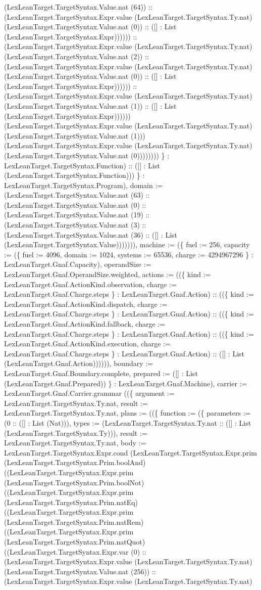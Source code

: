 \documentclass[11pt]{article}
\begin{document}
(LexLeanTarget.TargetSyntax.Value.nat (64)) :: (LexLeanTarget.TargetSyntax.Expr.value (LexLeanTarget.TargetSyntax.Ty.nat) (LexLeanTarget.TargetSyntax.Value.nat (0)) :: ([] : List (LexLeanTarget.TargetSyntax.Expr)))))) :: (LexLeanTarget.TargetSyntax.Expr.value (LexLeanTarget.TargetSyntax.Ty.nat) (LexLeanTarget.TargetSyntax.Value.nat (2)) :: (LexLeanTarget.TargetSyntax.Expr.value (LexLeanTarget.TargetSyntax.Ty.nat) (LexLeanTarget.TargetSyntax.Value.nat (0)) :: ([] : List (LexLeanTarget.TargetSyntax.Expr)))))) :: (LexLeanTarget.TargetSyntax.Expr.value (LexLeanTarget.TargetSyntax.Ty.nat) (LexLeanTarget.TargetSyntax.Value.nat (1)) :: ([] : List (LexLeanTarget.TargetSyntax.Expr)))))) (LexLeanTarget.TargetSyntax.Expr.value (LexLeanTarget.TargetSyntax.Ty.nat) (LexLeanTarget.TargetSyntax.Value.nat (1))) (LexLeanTarget.TargetSyntax.Expr.value (LexLeanTarget.TargetSyntax.Ty.nat) (LexLeanTarget.TargetSyntax.Value.nat (0)))))))) \} : LexLeanTarget.TargetSyntax.Function) :: ([] : List (LexLeanTarget.TargetSyntax.Function))) \} : LexLeanTarget.TargetSyntax.Program), domain := (LexLeanTarget.TargetSyntax.Value.nat (63) :: (LexLeanTarget.TargetSyntax.Value.nat (0) :: (LexLeanTarget.TargetSyntax.Value.nat (19) :: (LexLeanTarget.TargetSyntax.Value.nat (3) :: (LexLeanTarget.TargetSyntax.Value.nat (36) :: ([] : List (LexLeanTarget.TargetSyntax.Value))))))), machine := (\{ fuel := 256, capacity := (\{ fuel := 4096, domain := 1024, systems := 65536, charge := 4294967296 \} : LexLeanTarget.Gnaf.Capacity), operandSize := LexLeanTarget.Gnaf.OperandSize.weighted, actions := ((\{ kind := LexLeanTarget.Gnaf.ActionKind.observation, charge := LexLeanTarget.Gnaf.Charge.steps \} : LexLeanTarget.Gnaf.Action) :: ((\{ kind := LexLeanTarget.Gnaf.ActionKind.dispatch, charge := LexLeanTarget.Gnaf.Charge.steps \} : LexLeanTarget.Gnaf.Action) :: ((\{ kind := LexLeanTarget.Gnaf.ActionKind.fallback, charge := LexLeanTarget.Gnaf.Charge.steps \} : LexLeanTarget.Gnaf.Action) :: ((\{ kind := LexLeanTarget.Gnaf.ActionKind.execution, charge := LexLeanTarget.Gnaf.Charge.steps \} : LexLeanTarget.Gnaf.Action) :: ([] : List (LexLeanTarget.Gnaf.Action)))))), boundary := LexLeanTarget.Gnaf.Boundary.complete, prepared := ([] : List (LexLeanTarget.Gnaf.Prepared)) \} : LexLeanTarget.Gnaf.Machine), carrier := LexLeanTarget.Gnaf.Carrier.grammar ((\{ argument := LexLeanTarget.TargetSyntax.Ty.nat, result := LexLeanTarget.TargetSyntax.Ty.nat, plans := ((\{ function := (\{ parameters := (0 :: ([] : List (Nat))), types := (LexLeanTarget.TargetSyntax.Ty.nat :: ([] : List (LexLeanTarget.TargetSyntax.Ty))), result := LexLeanTarget.TargetSyntax.Ty.nat, body := LexLeanTarget.TargetSyntax.Expr.cond (LexLeanTarget.TargetSyntax.Expr.prim (LexLeanTarget.TargetSyntax.Prim.boolAnd) ((LexLeanTarget.TargetSyntax.Expr.prim (LexLeanTarget.TargetSyntax.Prim.boolNot) ((LexLeanTarget.TargetSyntax.Expr.prim (LexLeanTarget.TargetSyntax.Prim.natEq) ((LexLeanTarget.TargetSyntax.Expr.prim (LexLeanTarget.TargetSyntax.Prim.natRem) ((LexLeanTarget.TargetSyntax.Expr.prim (LexLeanTarget.TargetSyntax.Prim.natQuot) ((LexLeanTarget.TargetSyntax.Expr.var (0) :: (LexLeanTarget.TargetSyntax.Expr.value (LexLeanTarget.TargetSyntax.Ty.nat) (LexLeanTarget.TargetSyntax.Value.nat (256)) :: (LexLeanTarget.TargetSyntax.Expr.value (LexLeanTarget.TargetSyntax.Ty.nat) 
\end{document}
